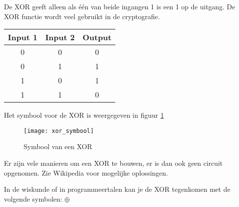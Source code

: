 De XOR geeft alleen als \'e\'en van beide ingangen 1 is een 1 op de uitgang. De XOR functie wordt veel gebruikt in de cryptografie.

\begin{tabular}{ |c|c|c| }
\hline
\rowcolor{gray!60}
	Input 1 & Input 2 & Output \\
	\hline
	0 & 0 & 0 \\
	\hline
	0 & 1 & 1 \\
	\hline
	1 & 0 & 1 \\
	\hline
	1 & 1 & 0 \\
	\hline
\end{tabular}

Het symbool voor de XOR is weergegeven in figuur \ref{symbool:xor}

\begin{figure}[h]
\texttt{[image: xor\_symbool]}
\centering
\caption{Symbool van een XOR}
\label{symbool:xor}
\end{figure}

Er zijn vele manieren om een XOR te bouwen, er is dan ook geen circuit opgenomen. Zie Wikipedia voor mogelijke oplossingen.

In de wiskunde of in programmeertalen kan je de XOR tegenkomen met de volgende symbolen:
\begin{math}
\oplus \; 
\end{math}
